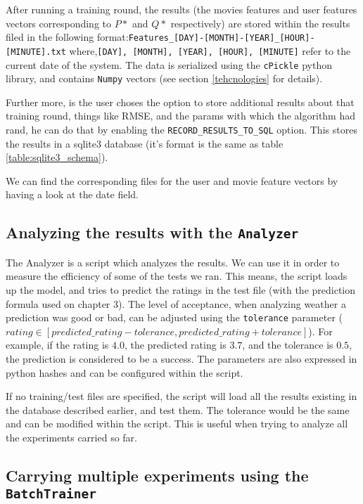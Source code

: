 \documentclass[11pt]{amsart}
\begin{document}
After running a training round, the results (the movies features and user features vectors corresponding to $P*$ and $Q*$ respectively) are stored within the results filed in the following format:\newline \texttt{Features\_[DAY]-[MONTH]-[YEAR]\_[HOUR]-[MINUTE].txt} where,\newline \texttt{[DAY], [MONTH], [YEAR], [HOUR], [MINUTE]} refer to the current date of the system. The data is serialized using the \texttt{cPickle} python library, and contains \texttt{Numpy} vectors (see section \ref{tehcnologies} for details). 

Further more, is the user choses the option to store additional results about that training round, things like RMSE, and the params with which the algorithm had rand, he can do that by enabling the \texttt{RECORD\_RESULTS\_TO\_SQL} option. This stores the results in a sqlite3 database (it's format is the same as table \ref{table:sqlite3_schema}). 

We can find the corresponding files for the user and movie feature vectors by having a look at the date field. 

\subsection{Analyzing the results with the \texttt{Analyzer}}

The Analyzer is a script which analyzes the results. We can use it in order to measure the efficiency of some of the tests we ran. This means, the script loads up the model, and tries to predict the ratings in the test file (with the prediction formula used on chapter 3). The level of acceptance, when analyzing weather a prediction was good or bad, can be adjusted using the \texttt{tolerance} parameter ($rating \in [predicted\_rating - tolerance, predicted\_rating + tolerance]$). For example, if the rating is $4.0$, the predicted rating is $3.7$, and the tolerance is $0.5$, the prediction is considered to be a success.  The parameters are also expressed in python hashes and can be configured within the script. 

If no training/test files are specified, the script will load all the results existing in the database described earlier, and test them. The tolerance would be the same and can be modified within the script. This is useful when trying to analyze all the experiments carried so far. 

\subsection{Carrying multiple experiments using the \texttt{BatchTrainer}}
\end{document}

